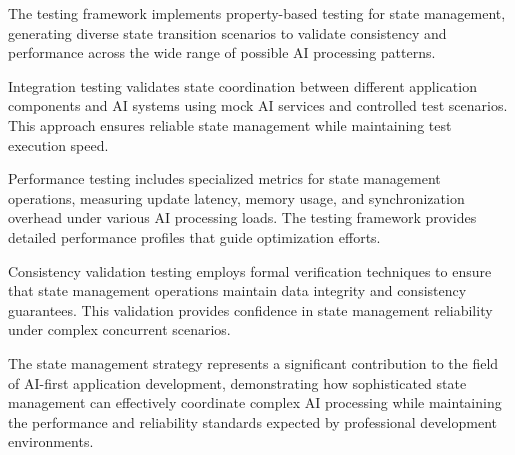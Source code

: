 \begin{infobox}[title=Testing Strategy]
The testing framework implements property-based testing for state management, generating diverse state transition scenarios to validate consistency and performance across the wide range of possible AI processing patterns.
\end{infobox}

Integration testing validates state coordination between different application components and AI systems using mock AI services and controlled test scenarios. This approach ensures reliable state management while maintaining test execution speed.

Performance testing includes specialized metrics for state management operations, measuring update latency, memory usage, and synchronization overhead under various AI processing loads. The testing framework provides detailed performance profiles that guide optimization efforts.

Consistency validation testing employs formal verification techniques to ensure that state management operations maintain data integrity and consistency guarantees. This validation provides confidence in state management reliability under complex concurrent scenarios.

The state management strategy represents a significant contribution to the field of AI-first application development, demonstrating how sophisticated state management can effectively coordinate complex AI processing while maintaining the performance and reliability standards expected by professional development environments.

